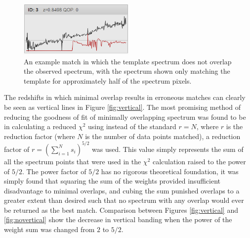 \documentclass[titlesmallcaps, examinerscopy, copyrightpage]{uqthesis}
\newcommand{\brac}[1]{\left( #1 \right)}
\begin{document}
\begin{figure}[ht!]
\includegraphics[width=0.5\textwidth]{images/overlap.png} 
\centering
\caption{An example match in which the template spectrum does not overlap the observed spectrum, with the spectrum shown only matching the template for approximately half of the spectrum pixels.}
\label{fig:overlap}
\end{figure}

The redshifts in which minimal overlap results in erroneous matches can clearly be seen as vertical lines in Figure \ref{fig:vertical}. The most promising method of reducing the goodness of fit of minimally overlapping spectrum was found to be in calculating a reduced $\chi^2$ using instead of the standard $r = N$, where $r$ is the reduction factor (where $N$ is the number of data points matched), a reduction factor of $r = \brac{\sum_{i=1}^N s_i}^{5/2}$ was used. This value simply represents the sum of all the spectrum points that were used in the $\chi^2$ calculation raised to the power of $5/2$. The power factor of $5/2$ has no rigorous theoretical foundation, it was simply found that squaring the sum of the weights provided insufficient disadvantage to minimal overlaps, and cubing the sum punished overlaps to a greater extent than desired such that no spectrum with any overlap would ever be returned as the best match. Comparison between Figures \ref{fig:vertical} and \ref{fig:novertical} show the decrease in vertical banding when the power of the weight sum was changed from $2$ to $5/2$.
\end{document}
